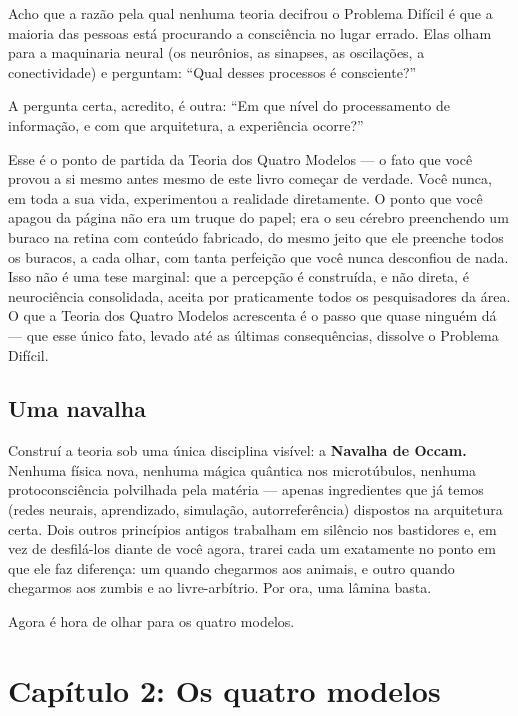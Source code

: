 \documentclass[11pt, twoside, openright]{book}
\begin{document}
Acho que a razão pela qual nenhuma teoria decifrou o Problema Difícil é que a maioria das pessoas está procurando a consciência no lugar errado. Elas olham para a maquinaria neural (os neurônios, as sinapses, as oscilações, a conectividade) e perguntam: ``Qual desses processos é consciente?''

A pergunta certa, acredito, é outra: ``Em que nível do processamento de informação, e com que arquitetura, a experiência ocorre?''

Esse é o ponto de partida da Teoria dos Quatro Modelos --- o fato que você provou a si mesmo antes mesmo de este livro começar de verdade. Você nunca, em toda a sua vida, experimentou a realidade diretamente. O ponto que você apagou da página não era um truque do papel; era o seu cérebro preenchendo um buraco na retina com conteúdo fabricado, do mesmo jeito que ele preenche todos os buracos, a cada olhar, com tanta perfeição que você nunca desconfiou de nada. Isso não é uma tese marginal: que a percepção é construída, e não direta, é neurociência consolidada, aceita por praticamente todos os pesquisadores da área. O que a Teoria dos Quatro Modelos acrescenta é o passo que quase ninguém dá --- que esse único fato, levado até as últimas consequências, dissolve o Problema Difícil.

\section*{Uma navalha}

Construí a teoria sob uma única disciplina visível: a \textbf{Navalha de Occam.} Nenhuma física nova, nenhuma mágica quântica nos microtúbulos, nenhuma protoconsciência polvilhada pela matéria --- apenas ingredientes que já temos (redes neurais, aprendizado, simulação, autorreferência) dispostos na arquitetura certa. Dois outros princípios antigos trabalham em silêncio nos bastidores e, em vez de desfilá-los diante de você agora, trarei cada um exatamente no ponto em que ele faz diferença: um quando chegarmos aos animais, e outro quando chegarmos aos zumbis e ao livre-arbítrio. Por ora, uma lâmina basta.

Agora é hora de olhar para os quatro modelos.


\chapter*{Capítulo 2: Os quatro modelos}
\end{document}

